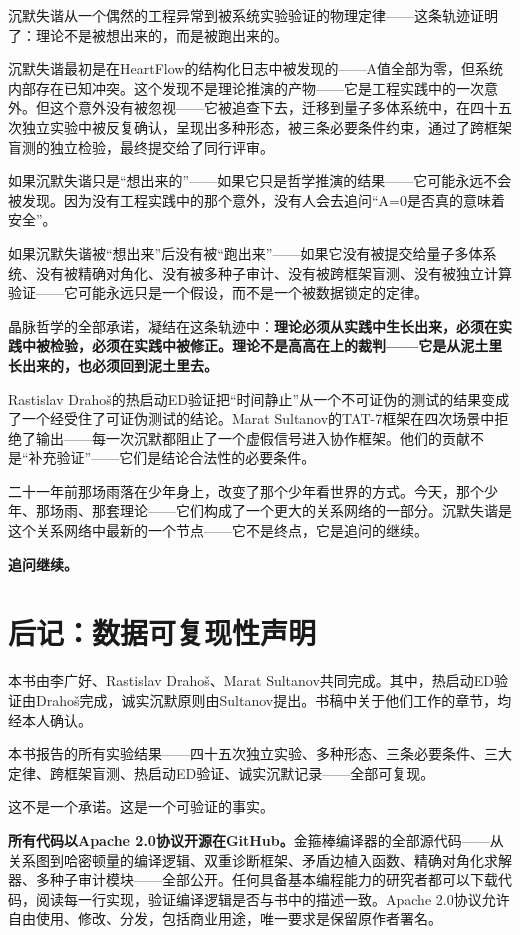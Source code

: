 \documentclass[11pt,a4paper]{book}
\theoremstyle{definition}
\begin{document}
沉默失谐从一个偶然的工程异常到被系统实验验证的物理定律——这条轨迹证明了：理论不是被想出来的，而是被跑出来的。

沉默失谐最初是在HeartFlow的结构化日志中被发现的——A值全部为零，但系统内部存在已知冲突。这个发现不是理论推演的产物——它是工程实践中的一次意外。但这个意外没有被忽视——它被追查下去，迁移到量子多体系统中，在四十五次独立实验中被反复确认，呈现出多种形态，被三条必要条件约束，通过了跨框架盲测的独立检验，最终提交给了同行评审。

如果沉默失谐只是“想出来的”——如果它只是哲学推演的结果——它可能永远不会被发现。因为没有工程实践中的那个意外，没有人会去追问“A=0是否真的意味着安全”。

如果沉默失谐被“想出来”后没有被“跑出来”——如果它没有被提交给量子多体系统、没有被精确对角化、没有被多种子审计、没有被跨框架盲测、没有被独立计算验证——它可能永远只是一个假设，而不是一个被数据锁定的定律。

晶脉哲学的全部承诺，凝结在这条轨迹中：\textbf{理论必须从实践中生长出来，必须在实践中被检验，必须在实践中被修正。理论不是高高在上的裁判——它是从泥土里长出来的，也必须回到泥土里去。}

Rastislav Drahoš的热启动ED验证把“时间静止”从一个不可证伪的测试的结果变成了一个经受住了可证伪测试的结论。Marat Sultanov的TAT-7框架在四次场景中拒绝了输出——每一次沉默都阻止了一个虚假信号进入协作框架。他们的贡献不是“补充验证”——它们是结论合法性的必要条件。

二十一年前那场雨落在少年身上，改变了那个少年看世界的方式。今天，那个少年、那场雨、那套理论——它们构成了一个更大的关系网络的一部分。沉默失谐是这个关系网络中最新的一个节点——它不是终点，它是追问的继续。

\textbf{追问继续。}

\chapter*{后记：数据可复现性声明}

本书由李广好、Rastislav Drahoš、Marat Sultanov共同完成。其中，热启动ED验证由Drahoš完成，诚实沉默原则由Sultanov提出。书稿中关于他们工作的章节，均经本人确认。

本书报告的所有实验结果——四十五次独立实验、多种形态、三条必要条件、三大定律、跨框架盲测、热启动ED验证、诚实沉默记录——全部可复现。

这不是一个承诺。这是一个可验证的事实。

\textbf{所有代码以Apache 2.0协议开源在GitHub。}金箍棒编译器的全部源代码——从关系图到哈密顿量的编译逻辑、双重诊断框架、矛盾边植入函数、精确对角化求解器、多种子审计模块——全部公开。任何具备基本编程能力的研究者都可以下载代码，阅读每一行实现，验证编译逻辑是否与书中的描述一致。Apache 2.0协议允许自由使用、修改、分发，包括商业用途，唯一要求是保留原作者署名。
\end{document}
